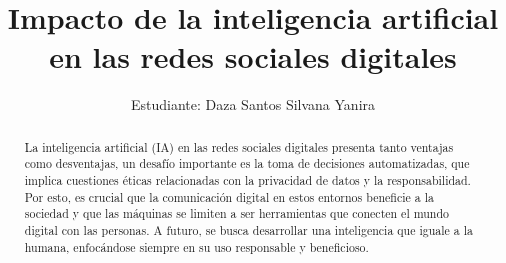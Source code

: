 \documentclass[runningheads]{llncs}
\begin{document}
%
\title{Impacto de la inteligencia artificial en las redes sociales digitales}

%
\author{Estudiante: Daza Santos Silvana Yanira}
%
%
%
\maketitle 
\begin{abstract}
La inteligencia artificial (IA) en las redes sociales digitales presenta tanto ventajas como desventajas, un desafío importante es la toma de decisiones automatizadas, que implica cuestiones éticas relacionadas con la privacidad de datos y la responsabilidad. Por esto, es crucial que la comunicación digital en estos entornos beneficie a la sociedad y que las máquinas se limiten a ser herramientas que conecten el mundo digital con las personas. A futuro, se busca desarrollar una inteligencia que iguale a la humana, enfocándose siempre en su uso responsable y beneficioso.
\end{abstract}
%
\end{document}
